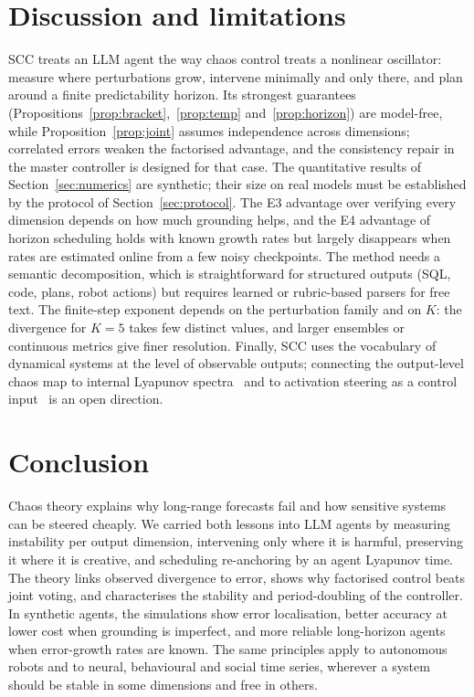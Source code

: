 \documentclass[preprint,12pt]{elsarticle}
\begin{document}
\section{Discussion and limitations}
\label{sec:discussion}
SCC treats an LLM agent the way chaos control treats a nonlinear oscillator: measure where perturbations grow, intervene minimally and only there, and plan around a finite predictability horizon. Its strongest guarantees (Propositions~\ref{prop:bracket},~\ref{prop:temp} and~\ref{prop:horizon}) are model-free, while Proposition~\ref{prop:joint} assumes independence across dimensions; correlated errors weaken the factorised advantage, and the consistency repair in the master controller is designed for that case. The quantitative results of Section~\ref{sec:numerics} are synthetic; their size on real models must be established by the protocol of Section~\ref{sec:protocol}. The E3 advantage over verifying every dimension depends on how much grounding helps, and the E4 advantage of horizon scheduling holds with known growth rates but largely disappears when rates are estimated online from a few noisy checkpoints. The method needs a semantic decomposition, which is straightforward for structured outputs (SQL, code, plans, robot actions) but requires learned or rubric-based parsers for free text. The finite-step exponent depends on the perturbation family and on $K$: the divergence for $K=5$ takes few distinct values, and larger ensembles or continuous metrics give finer resolution. Finally, SCC uses the vocabulary of dynamical systems at the level of observable outputs; connecting the output-level chaos map to internal Lyapunov spectra~\cite{engelken2023,li2025quasi} and to activation steering as a control input~\cite{li2023iti} is an open direction.

\section{Conclusion}
\label{sec:conclusion}
Chaos theory explains why long-range forecasts fail and how sensitive systems can be steered cheaply. We carried both lessons into LLM agents by measuring instability per output dimension, intervening only where it is harmful, preserving it where it is creative, and scheduling re-anchoring by an agent Lyapunov time. The theory links observed divergence to error, shows why factorised control beats joint voting, and characterises the stability and period-doubling of the controller. In synthetic agents, the simulations show error localisation, better accuracy at lower cost when grounding is imperfect, and more reliable long-horizon agents when error-growth rates are known. The same principles apply to autonomous robots and to neural, behavioural and social time series, wherever a system should be stable in some dimensions and free in others.
\end{document}
